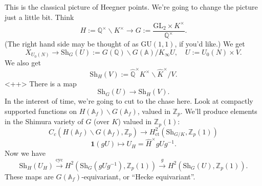 \documentclass[reqno]{amsart} 
\numberwithin{theorem}{section}
\numberwithin{equation}{section}
\numberwithin{exercise}{section}
\begin{document}
This is the classical picture of Heegner points.  We're going to change the picture just a little bit.  Think
\begin{equation}\label{eq:cq6s0mlq0m}
  H := \mathbb{Q}^\times \backslash K^\times \rightarrow G := \frac{\mathrm{GL}_2 \times K^\times}{\mathbb{Q}^\times}.
\end{equation}
(The right hand side may be thought of as $\mathrm{GU}(1, 1)$, if you'd like.)  We get
\begin{equation*}
  X_{U_0(N)} \rightarrow
  \mathrm{S h}_G(U) := G(\mathbb{Q}) \backslash G(\mathbb{A}) / K_\infty U, \quad U := U_0(N) \times V.
\end{equation*}
We also get
\begin{equation*}
  \mathrm{S h}_H(V) := \hat{\mathbb{Q}}^\times K^\times \backslash \hat{K}^\times / V.
\end{equation*}<++>
There is a map
\begin{equation*}
  \mathrm{S h}_G(U) \rightarrow \mathrm{Sh}_H(V).
\end{equation*}
In the interest of time, we're going to cut to the chase here.  Look at compactly supported functions on $H(\mathbb{A}_f) \backslash G(\mathbb{A}_f)$, valued in $\mathbb{Z}_p$.  We'll produce elements in the Shimura variety of $G$ (over $K$) valued in $\mathbb{Z}_p(1)$:
\begin{equation}\label{eq:cq6s0i3k4v}
  C_c(H(\mathbb{A}_f) \backslash G(\mathbb{A}_f), \mathbb{Z}_p)
  \rightarrow H^2_{\mathrm{ct}}(\mathrm{S h}_{G /K}, \mathbb{Z}_p(1))
\end{equation}
\begin{equation*}
  \mathbf{1}(g U) \mapsto U_H = \hat{H}^\times g U g^{-1}.
\end{equation*}
Now we have
\begin{equation*}
  \mathrm{Sh}_H(U_H) \xrightarrow{\mathrm{cyc}}
  H^2(\mathrm{Sh}_G(g U g^{-1}), \mathbb{Z}_p(1)) \xrightarrow{g}
  H^2(\mathrm{Sh}_G(U), \mathbb{Z}_p(1)).
\end{equation*}
These maps are $G(\mathbb{A}_f)$-equivariant, or ``Hecke equivariant''.
\end{document}
